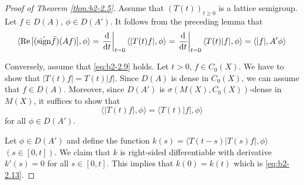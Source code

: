 \begin{proof}[Proof of Theorem \ref{thm:b2-2.5}]
Assume that $(T(t))_{t \geq 0}$ is a lattice semigroup.
Let $f \in D(A)$, $\phi \in D(A')$.
It follows from the preceding lemma that
\[
\langle \Re[(\hat{\sign} \bar{f})(Af)],\phi \rangle %
= \left.\frac{\diff{}}{\dt}\right|_{t=0} \langle |T(t)f|,\phi \rangle = \left.\frac{\diff{}}{\dt}\right|_{t=0} \langle T(t)|f|,\phi \rangle 
= \langle |f|,A'\phi \rangle
\]

Conversely, assume that \eqref{eq:b2-2.9} holds.
Let $t > 0$, $f \in C_{0}(X)$.
We have to show that $|T(t)f| = T(t)|f|$.
Since $D(A)$ is dense in $C_{0}(X)$, we can assume that $f \in D(A)$.
Moreover, since $D(A')$ is $\sigma(M(X),C_{0}(X))$-dense in $M(X)$, it suffices to show that
\begin{equation}\label{eq:b2-2.13}
\langle |T(t)f|,\phi \rangle = \langle T(t)|f|,\phi \rangle
\end{equation}
for all $\phi \in D(A')$.

Let $\phi \in D(A')$ and define the function $k(s) = \langle T(t-s)|T(s)f|,\phi \rangle$ $(s \in [0,t])$.
We claim that $k$ is right-sided differentiable with derivative $k'(s) = 0$ for all $s \in [0,t]$.
This implies that $k(0) = k(t)$ which is \eqref{eq:b2-2.13}.


\end{proof}

